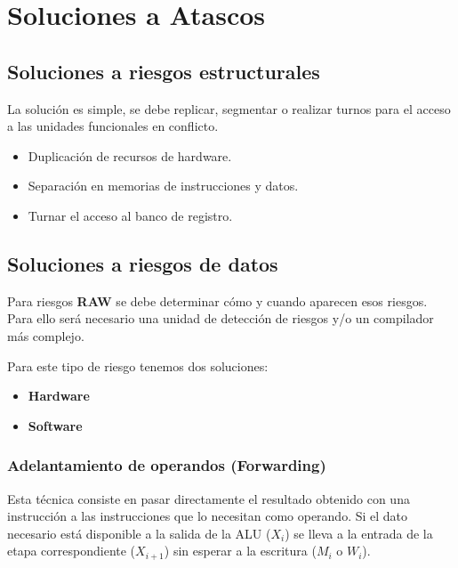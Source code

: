 \section{Soluciones a Atascos}\label{sec:stalls}

\subsection{Soluciones a riesgos estructurales}

La solución es simple, se debe replicar, segmentar o realizar turnos para el acceso a las unidades funcionales en conflicto.

\begin{itemize}
  \item Duplicación de recursos de hardware.
  \item Separación en memorias de instrucciones y datos.
  \item Turnar el acceso al banco de registro.
\end{itemize}

\subsection{Soluciones a riesgos de datos}

Para riesgos \textbf{RAW} se debe determinar cómo y cuando aparecen esos riesgos. Para ello será necesario una unidad de detección de riesgos y/o un compilador más complejo.

Para este tipo de riesgo tenemos dos soluciones:

\begin{itemize}
  \item \textbf{Hardware}
  \item \textbf{Software}
\end{itemize}

\subsubsection{Adelantamiento de operandos (Forwarding)}

Esta técnica consiste en pasar directamente el resultado obtenido con una instrucción a las instrucciones que lo necesitan como operando. Si el dato necesario está disponible a la salida de la ALU ($X_i$) se lleva a la entrada de la etapa correspondiente ($X_{i+1}$) sin esperar a la escritura ($M_i$ o $W_i$).


